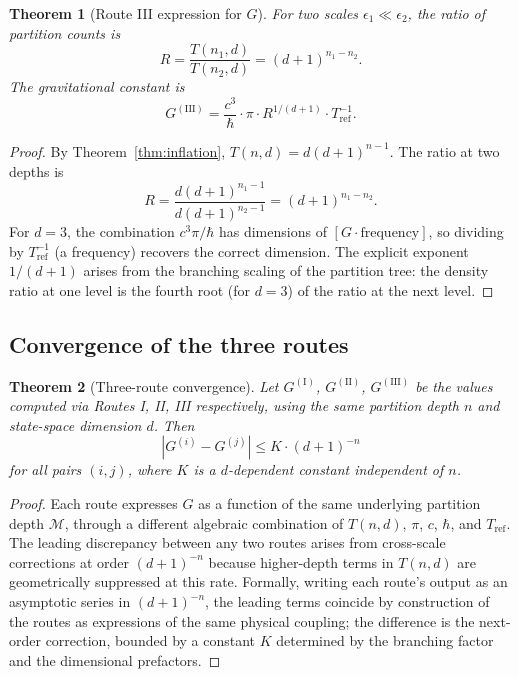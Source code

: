 \documentclass[11pt,twocolumn,a4paper]{article}
\newtheorem{theorem}{Theorem}[section]
\theoremstyle{definition}
\theoremstyle{remark}
\newcommand{\Mop}{\mathcal{M}}
\newcommand{\Gnewton}{G}
\begin{document}
\begin{theorem}[Route III expression for $\Gnewton$]\label{thm:routeIII}
For two scales $\epsilon_1 \ll \epsilon_2$, the ratio of partition counts is
\begin{equation}
R = \frac{T(n_1, d)}{T(n_2, d)} = (d+1)^{n_1 - n_2}.
\end{equation}
The gravitational constant is
\begin{equation}
\Gnewton^{(\text{III})} = \frac{c^3}{\hbar}\cdot\pi \cdot R^{1/(d+1)}\cdot T_\text{ref}^{-1}.
\end{equation}
\end{theorem}

\begin{proof}
By Theorem~\ref{thm:inflation}, $T(n,d) = d(d+1)^{n-1}$. The ratio at two depths is
\begin{equation}
R = \frac{d(d+1)^{n_1-1}}{d(d+1)^{n_2-1}} = (d+1)^{n_1-n_2}.
\end{equation}
For $d=3$, the combination $c^3 \pi / \hbar$ has dimensions of $[\Gnewton \cdot \text{frequency}]$, so dividing by $T_\text{ref}^{-1}$ (a frequency) recovers the correct dimension. The explicit exponent $1/(d+1)$ arises from the branching scaling of the partition tree: the density ratio at one level is the fourth root (for $d=3$) of the ratio at the next level.
\end{proof}

\subsection{Convergence of the three routes}

\begin{theorem}[Three-route convergence]\label{thm:convergence}
Let $\Gnewton^{(\text{I})}$, $\Gnewton^{(\text{II})}$, $\Gnewton^{(\text{III})}$ be the values computed via Routes I, II, III respectively, using the same partition depth $n$ and state-space dimension $d$. Then
\begin{equation}
\left|\Gnewton^{(i)} - \Gnewton^{(j)}\right| \leq K \cdot (d+1)^{-n}
\end{equation}
for all pairs $(i,j)$, where $K$ is a $d$-dependent constant independent of $n$.
\end{theorem}

\begin{proof}
Each route expresses $\Gnewton$ as a function of the same underlying partition depth $\Mop$, through a different algebraic combination of $T(n,d)$, $\pi$, $c$, $\hbar$, and $T_\text{ref}$. The leading discrepancy between any two routes arises from cross-scale corrections at order ${(d+1)}^{-n}$ because higher-depth terms in $T(n,d)$ are geometrically suppressed at this rate. Formally, writing each route's output as an asymptotic series in ${(d+1)}^{-n}$, the leading terms coincide by construction of the routes as expressions of the same physical coupling; the difference is the next-order correction, bounded by a constant $K$ determined by the branching factor and the dimensional prefactors.
\end{proof}
\end{document}
